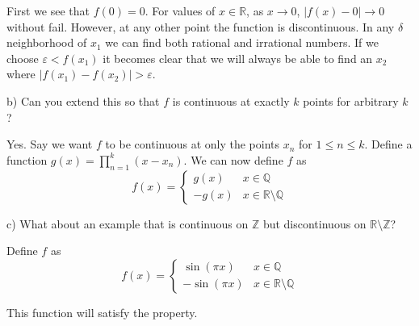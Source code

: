\documentclass[11pt]{article}
\newcommand{\Z}{\mathbb{Z}}
\newcommand{\Q}{\mathbb{Q}}
\newcommand{\R}{\mathbb{R}}
\begin{document}
First we see that $f(0)=0$. 
For values of $x\in\R$, as $x\to 0$, $|f(x)-0|\to 0$ without fail.
However, at any other point the function is discontinuous.
In any $\delta$ neighborhood of $x_1$ we can find both rational and irrational numbers.
If we choose $\varepsilon<f(x_1)$ it becomes clear that we will always be able
to find an $x_2$ where $|f(x_1)-f(x_2)|>\varepsilon$.

b) Can you extend this so that $f$ is continuous at exactly $k$ points for
arbitrary $k$?

Yes. Say we want $f$ to be continuous at only the points
$x_n$ for $1\leq n\leq k$.
Define a function $g(x)=\prod_{n=1}^k(x-x_n)$. We can now define $f$ as
\[
f(x)=\begin{cases}
    g(x) & x\in\Q \\
    -g(x) & x\in\R\setminus\Q
\end{cases}
\]

c) What about an example that is continuous on $\Z$ but discontinuous on
$\R\setminus\Z$?

Define $f$ as 
\[
f(x)=\begin{cases}
    \sin(\pi x) & x\in\Q \\
    -\sin(\pi x) & x\in\R\setminus\Q
\end{cases}
\]

This function will satisfy the property.
\end{document}
